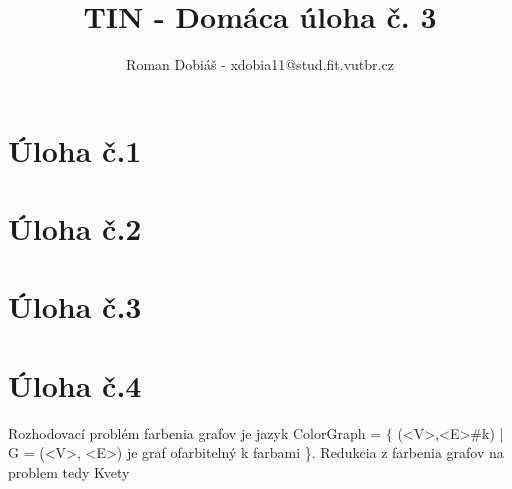 \documentclass[10pt]{article}
\begin{document}
 
 
 
\title{TIN - Domáca úloha č. 3}%
\author{Roman Dobiáš - xdobia11@stud.fit.vutbr.cz}
 
\maketitle

\section*{Úloha č.1}
\section*{Úloha č.2}
\section*{Úloha č.3}
\section*{Úloha č.4}
Rozhodovací problém farbenia grafov je jazyk ColorGraph = $\{$ (<V>,<E>#k) | G = (<V>, <E>) je graf
ofarbitelný k farbami \}.
Redukcia z farbenia grafov na problem tedy Kvety 
\end{document}
